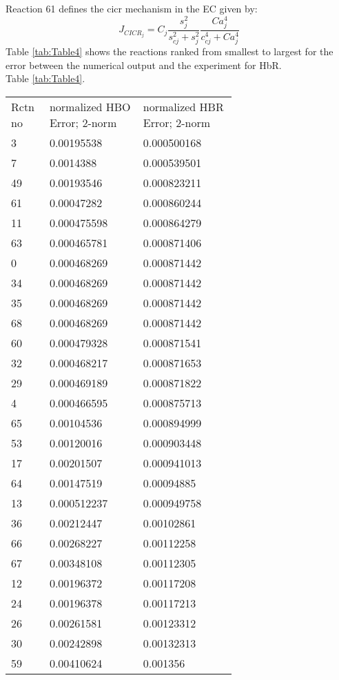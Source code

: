 \documentclass[]{article}
\begin{document}
Reaction 61 defines the \Gls{cicr} mechanism in the EC given by:
\begin{equation} \label{eq:JCICRJ}
J_{CICR_{j}} = C_{j}\frac{s_j^{2}}{s_{cj}^{2}+s_j^{2}}    \frac{Ca_j^{4}}{c_{cj}^{4}+Ca_j^{4}}
\end{equation}
Table \ref{tab:Table4} shows the reactions ranked from smallest to largest for the error between the numerical output and the experiment for HbR.\\
Table \ref{tab:Table4}.
\begin{longtable}[h!] { p{0.05\linewidth}  p{0.3\linewidth}   p{0.3\linewidth} }
	\hline
Rctn no	&	normalized HBO Error; 2-norm	& normalized HBR Error; 2-norm\\
3	&	0.00195538	&0.000500168\\
7	&0.0014388	&0.000539501\\
49	&0.00193546&	0.000823211\\
61	&0.00047282&	0.000860244\\
11&	0.000475598	&0.000864279\\
63	&0.000465781	&0.000871406\\
0	&	0.000468269	&0.000871442\\
34&0.000468269	&0.000871442\\
35	&	0.000468269	&0.000871442\\
68	& 0.000468269	&0.000871442\\
60&	0.000479328&	0.000871541\\
32&	0.000468217	&0.000871653\\
29	&0.000469189&	0.000871822\\
4	&0.000466595	&0.000875713\\
65	&	0.00104536	&0.000894999\\
53	&	0.00120016	&0.000903448\\
17	&	0.00201507	&0.000941013\\
64	&	0.00147519&	0.00094885\\
13	&0.000512237	&0.000949758\\
36	&	0.00212447	&0.00102861\\
66	&	0.00268227&	0.00112258\\
67	&0.00348108&	0.00112305\\
12	&	0.00196372&	0.00117208\\
24&	0.00196378&	0.00117213\\
26	&	0.00261581	&0.00123312\\
30	&0.00242898	&0.00132313\\
59	&	0.00410624	&0.001356\\

\end{longtable}
\end{document}
